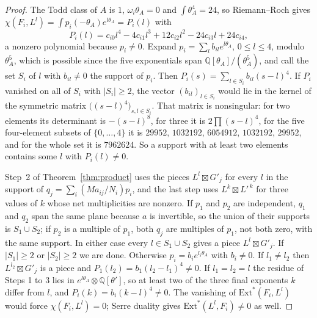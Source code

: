 \documentclass[11pt,reqno]{amsart}
\numberwithin{equation}{section}
\theoremstyle{plain}
\theoremstyle{definition}
\newcommand{\QQ}{\mathbb{Q}}
\newcommand{\Ext}{\mathrm{Ext}}
\begin{document}
\begin{proof}
The Todd class of $A$ is $1$, $\omega_{i}\theta_{A}=0$ and $\int\theta_{A}^{4}=24$, so Riemann--Roch gives $\chi(F_{i},L^{l})=\int p_{i}(-\theta_{A})e^{l\theta_{A}}=P_{i}(l)$ with
\begin{equation}\label{eq:rrpoly}
P_{i}(l)=c_{i0}l^{4}-4c_{i1}l^{3}+12c_{i2}l^{2}-24c_{i3}l+24c_{i4},
\end{equation}
a nonzero polynomial because $p_{i}\ne0$. Expand $p_{i}=\sum_{l}b_{il}e^{l\theta_{A}}$, $0\le l\le4$, modulo $\theta_{A}^{5}$, which is possible since the five exponentials span $\QQ[\theta_{A}]/(\theta_{A}^{5})$, and call the set $S_{i}$ of $l$ with $b_{il}\ne0$ the support of $p_{i}$. Then $P_{i}(s)=\sum_{l\in S_{i}}b_{il}(s-l)^{4}$. If $P_{i}$ vanished on all of $S_{i}$ with $|S_{i}|\ge2$, the vector $(b_{il})_{l\in S_{i}}$ would lie in the kernel of the symmetric matrix $\bigl((s-l)^{4}\bigr)_{s,l\in S_{i}}$. That matrix is nonsingular: for two elements its determinant is $-(s-l)^{8}$, for three it is $2\prod(s-l)^{4}$, for the five four-element subsets of $\{0,\dots,4\}$ it is $29952$, $1032192$, $6054912$, $1032192$, $29952$, and for the whole set it is $7962624$. So a support with at least two elements contains some $l$ with $P_{i}(l)\ne0$.

Step~2 of Theorem~\ref{thm:product} uses the pieces $L^{l}\boxtimes G'_{j}$ for every $l$ in the support of $q_{j}=\sum_{i}(Ma_{ij}/N_{i})p_{i}$, and the last step uses $L^{k}\boxtimes L'^{\,k}$ for three values of $k$ whose net multiplicities are nonzero. If $p_{1}$ and $p_{2}$ are independent, $q_{1}$ and $q_{2}$ span the same plane because $a$ is invertible, so the union of their supports is $S_{1}\cup S_{2}$; if $p_{2}$ is a multiple of $p_{1}$, both $q_{j}$ are multiples of $p_{1}$, not both zero, with the same support. In either case every $l\in S_{1}\cup S_{2}$ gives a piece $L^{l}\boxtimes G'_{j}$. If $|S_{1}|\ge2$ or $|S_{2}|\ge2$ we are done. Otherwise $p_{i}=b_{i}e^{l_{i}\theta_{A}}$ with $b_{i}\ne0$. If $l_{1}\ne l_{2}$ then $L^{l_{2}}\boxtimes G'_{j}$ is a piece and $P_{1}(l_{2})=b_{1}(l_{2}-l_{1})^{4}\ne0$. If $l_{1}=l_{2}=l$ the residue of Steps 1 to 3 lies in $e^{l\theta_{A}}\otimes\QQ[\theta']$, so at least two of the three final exponents $k$ differ from $l$, and $P_{i}(k)=b_{i}(k-l)^{4}\ne0$. The vanishing of $\Ext^{*}(F_{i},L^{l})$ would force $\chi(F_{i},L^{l})=0$; Serre duality gives $\Ext^{*}(L^{l},F_{i})\ne0$ as well.
\end{proof}
\end{document}
